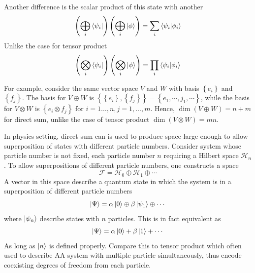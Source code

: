\documentclass[../../../main.tex]{subfiles}
\begin{document}
Another difference is the scalar product of this state with another
\begin{equation*}
  \left( \bigoplus_{i} \bra{\psi_i}  \right) \left( \bigoplus_{i } \ket{\phi} \right) = \sum_{i } \braket{\psi_i  | \phi_i}
\end{equation*}
Unlike the case for tensor product
\begin{equation*}
  \left( \bigotimes_{i} \bra{\psi_i}  \right) \left( \bigotimes_{i } \ket{\phi} \right) = \prod_{i } \braket{\psi_i  | \phi_i}
\end{equation*}

For example, consider the same vector space $V$ and $W$ with basis $\left\{ e_i \right\} $ and $\left\{ f_j \right\} $.
The basis for $V \oplus W$ is $\left\{ \left\{ e_i \right\},\left\{ f_j \right\}   \right\} = \left\{ e_{1},\cdots,j_{1},\cdots \right\} $, while the basis for $V \otimes W$ is $\left\{ e_i\otimes f_j \right\} $ for $i=1\dots,n,j=1,\dots ,m $.
Hence, $\dim (V \oplus W) = n+m$ for direct sum, unlike the case of tensor product $\dim (V \otimes W)=mn$.

In physics setting, direct sum can is used to produce space large enough to allow superposition of states with different particle numbers.
Consider system whose particle number is not fixed, each particle number $n$ requiring a Hilbert space $\mathcal{H}_n$.
To allow superpositions of different particle numbers, one constructs a space
\begin{equation*}
  \mathcal{F}=\mathcal{H}_0\oplus\mathcal{H}_1\oplus\cdots
\end{equation*}
A vector in this space describe a quantum state in which the system is in a superposition of different particle numbers
\begin{equation*}
  \ket{\Psi}=\alpha \ket{0}\oplus\beta \ket{\psi_1}\oplus\cdots
\end{equation*}
where $\ket{\psi_n} $ describe states with $n$ particles.
This is in fact equivalent as
\begin{equation*}
  \ket{\Psi} = \alpha \ket{0}+\beta \ket{1}+\cdots
\end{equation*}
As long as $\ket{n}$ is  defined properly.
Compare this to tensor product which often used to describe AA system with multiple particle simultaneously, thus encode coexisting degrees of freedom from each particle.
\end{document}
